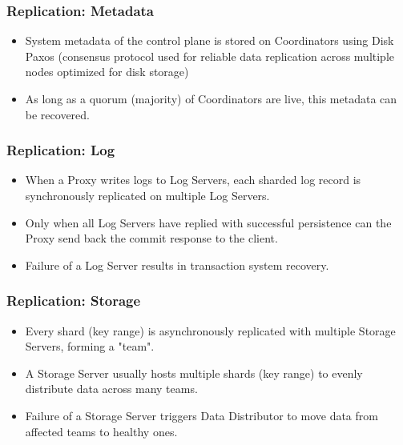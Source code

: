 





\begin{frame}
	\frametitle{Replication: Metadata}
    \begin{itemize}
      \item System metadata of the control plane is stored on Coordinators using Disk Paxos (consensus protocol used for reliable data replication across multiple nodes optimized for disk storage)
      \item As long as a quorum (majority) of Coordinators are live, this metadata can be recovered.

\end{itemize}
\end{frame}



\begin{frame}
	\frametitle{Replication: Log}
\begin{itemize}

      \item When a Proxy writes logs to Log Servers, each sharded log record is synchronously replicated on multiple Log Servers.
      \item Only when all Log Servers have replied with successful persistence can the Proxy send back the commit response to the client.
      \item Failure of a Log Server results in transaction system recovery.

\end{itemize}
\end{frame}



\begin{frame}
	\frametitle{Replication: Storage}
\begin{itemize}

      \item Every shard (key range) is asynchronously replicated with multiple Storage Servers, forming a "team".
      \item A Storage Server usually hosts multiple shards (key range) to evenly distribute data across many teams.
      \item Failure of a Storage Server triggers Data Distributor to move data from affected teams to healthy ones.

\end{itemize}
\end{frame}
